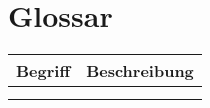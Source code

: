 \chapter{Glossar}

\begin{table}[ht!]
    \label{table:Glossary}
    \footnotesize
    \begin{threeparttable}
        \begin{tabular}{ l | l }
            \bf{Begriff}    & \bf{Beschreibung} \\
            \hline \hline
            \bf{} &  \\
            \hline
            \bf{} &  \\
        \end{tabular}
    \end{threeparttable}
\end{table}
